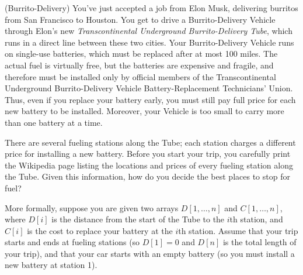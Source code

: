 \newpage
\begin{questions}
  \question (Burrito-Delivery) You’ve just accepted a job from Elon
  Musk, delivering burritos from San Francisco to Houston. You get to
  drive a Burrito-Delivery Vehicle through Elon’s new
  \emph{Transcontinental Underground Burrito-Delivery Tube}, which
  runs in a direct line between these two cities. Your
  Burrito-Delivery Vehicle runs on single-use batteries, which must be
  replaced after at most 100 miles. The actual fuel is virtually free,
  but the batteries are expensive and fragile, and therefore must be
  installed only by official members of the Transcontinental
  Underground Burrito-Delivery Vehicle Battery-Replacement
  Technicians’ Union. Thus, even if you replace your battery early,
  you must still pay full price for each new battery to be
  installed. Moreover, your Vehicle is too small to carry more than
  one battery at a time.

  There are several fueling stations along the Tube; each station
  charges a different price for installing a new battery. Before you
  start your trip, you carefully print the Wikipedia page listing the
  locations and prices of every fueling station along the Tube. Given
  this information, how do you decide the best places to stop for
  fuel?

  More formally, suppose you are given two arrays $D[1,\ldots,n]$ and
  $C[1,\ldots,n]$, where $D[i]$ is the distance from the start of the
  Tube to the $i$th station, and $C[i]$ is the cost to replace your
  battery at the $i$th station. Assume that your trip starts and ends
  at fueling stations (so $D[1] = 0$ and $D[n]$ is the total length of
  your trip), and that your car starts with an empty battery (so you
  must install a new battery at station 1).
\end{questions}

